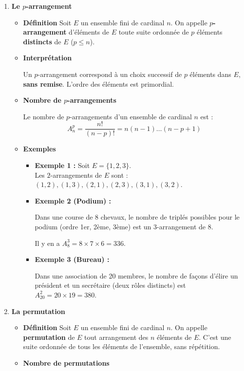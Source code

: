 \documentclass[12pt,a4paper]{article}
\begin{document}
\begin{enumerate}[label=\Roman*., font=\bfseries\color{red}]
\begin{enumerate}
\begin{enumerate}
\begin{itemize}
\end{itemize}

\item \textbf{Le $p$-arrangement}
\begin{itemize}
    \item \textbf{Définition}
Soit $E$ un ensemble fini de cardinal $n$.
On appelle \textbf{$p$-arrangement} d'éléments de $E$ toute suite ordonnée de $p$ éléments \textbf{distincts} de $E$ ($p \leq n$).
\item \textbf{Interprétation}

Un $p$-arrangement correspond à un choix successif de $p$ éléments dans $E$, \textbf{sans remise}. L'ordre des éléments est primordial.

\item \textbf{Nombre de $p$-arrangements}

Le nombre de $p$-arrangements d’un ensemble de cardinal $n$ est :
\[ A_n^p = \frac{n!}{(n-p)!} = n(n-1)\dots(n-p+1) \]
\item \textbf{Exemples}
\begin{itemize}
    \item \textbf{Exemple 1 :} Soit $E = \{1,2,3\}$.\\ 
    Les $2$-arrangements de $E$ sont : $(1,2), (1,3), (2,1), (2,3), (3,1), (3,2)$.
    \item \textbf{Exemple 2 (Podium) :} 
    
    Dans une course de 8 chevaux, le nombre de triplés possibles pour le podium (ordre 1er, 2ème, 3ème) est un 3-arrangement de 8.
    
     Il y en a $A_8^3 = 8 \times 7 \times 6 = 336$.
    \item \textbf{Exemple 3 (Bureau) :} 
    
    Dans une association de 20 membres, le nombre de façons d'élire un président et un secrétaire (deux rôles distincts) est $A_{20}^2 = 20 \times 19 = 380$.
\end{itemize}

\end{itemize}
\item \textbf{La permutation}
\begin{itemize}
    \item \textbf{Définition}
Soit \( E \) un ensemble fini de cardinal \( n \).
On appelle \textbf{permutation} de \( E \) tout arrangement des \( n \) éléments de \( E \). C'est une suite ordonnée de tous les éléments de l'ensemble, sans répétition.
\item \textbf{Nombre de permutations}


\end{itemize}
\end{enumerate}
\end{enumerate}
\end{enumerate}
\end{document}
